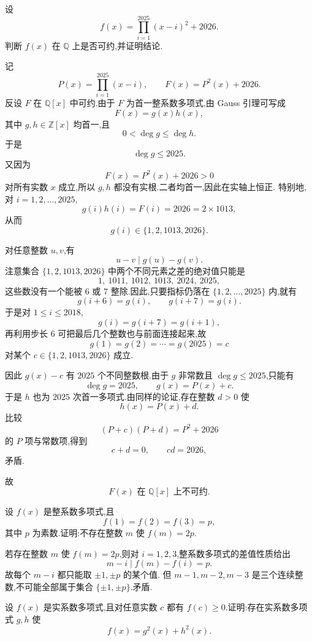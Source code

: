 \begin{example}
设
\[
  f(x)=\prod\limits_{i=1}^{2025}(x-i)^2+2026.
\]
判断 $f(x)$ 在 $\mathbb{Q}$ 上是否可约,并证明结论.
\end{example}
\exampleblank

\begin{solution}
记
\[
  P(x)=\prod\limits_{i=1}^{2025}(x-i),
  \qquad
  F(x)=P^2(x)+2026.
\]
反设 $F$ 在 $\mathbb{Q}[x]$ 中可约.由于 $F$ 为首一整系数多项式,由 Gauss 引理可写成
\[
  F(x)=g(x)h(x),
\]
其中 $g,h\in\mathbb{Z}[x]$ 均首一,且
\[
  0<\deg g\leq\deg h.
\]
于是
\[
  \deg g\leq2025.
\]
又因为
\[
  F(x)=P^2(x)+2026>0
\]
对所有实数 $x$ 成立,所以 $g,h$ 都没有实根.二者均首一,因此在实轴上恒正.
特别地,对 $i=1,2,\ldots,2025$,
\[
  g(i)h(i)=F(i)=2026=2\times1013,
\]
从而
\[
  g(i)\in\{1,2,1013,2026\}.
\]

对任意整数 $u,v$,有
\[
  u-v\mid g(u)-g(v).
\]
注意集合 $\{1,2,1013,2026\}$ 中两个不同元素之差的绝对值只能是
\[
  1,
  \ 1011,
  \ 1012,
  \ 1013,
  \ 2024,
  \ 2025,
\]
这些数没有一个能被 $6$ 或 $7$ 整除.因此,只要指标仍落在
$\{1,2,\ldots,2025\}$ 内,就有
\[
  g(i+6)=g(i),
  \qquad
  g(i+7)=g(i).
\]
于是对 $1\leq i\leq2018$,
\[
  g(i)=g(i+7)=g(i+1),
\]
再利用步长 $6$ 可把最后几个整数也与前面连接起来,故
\[
  g(1)=g(2)=\cdots=g(2025)=c
\]
对某个 $c\in\{1,2,1013,2026\}$ 成立.

因此 $g(x)-c$ 有 $2025$ 个不同整数根.由于 $g$ 非常数且
$\deg g\leq2025$,只能有
\[
  \deg g=2025,
  \qquad
  g(x)=P(x)+c.
\]
于是 $h$ 也为 $2025$ 次首一多项式.由同样的论证,存在整数 $d>0$ 使
\[
  h(x)=P(x)+d.
\]
比较
\[
  (P+c)(P+d)=P^2+2026
\]
的 $P$ 项与常数项,得到
\[
  c+d=0,
  \qquad
  cd=2026,
\]
矛盾.

故
\[
  \boxed{F(x)\text{ 在 }\mathbb{Q}[x]\text{ 上不可约}.}
\]
\end{solution}

\begin{example}
设 $f(x)$ 是整系数多项式,且
\[
  f(1)=f(2)=f(3)=p,
\]
其中 $p$ 为素数.证明:不存在整数 $m$ 使 $f(m)=2p$.
\end{example}
\exampleblank

\begin{solution}
若存在整数 $m$ 使 $f(m)=2p$,则对 $i=1,2,3$,整系数多项式的差值性质给出
\[
  m-i\mid f(m)-f(i)=p.
\]
故每个 $m-i$ 都只能取 $\pm1,\pm p$ 的某个值.
但 $m-1,m-2,m-3$ 是三个连续整数,不可能全部属于集合
$\{\pm1,\pm p\}$.矛盾.
\end{solution}

\begin{example}[\markstar]
设 $f(x)$ 是实系数多项式,且对任意实数 $c$ 都有 $f(c)\ge0$.证明:存在实系数多项式 $g,h$ 使
\[
  f(x)=g^2(x)+h^2(x).
\]
\end{example}
\exampleblank


